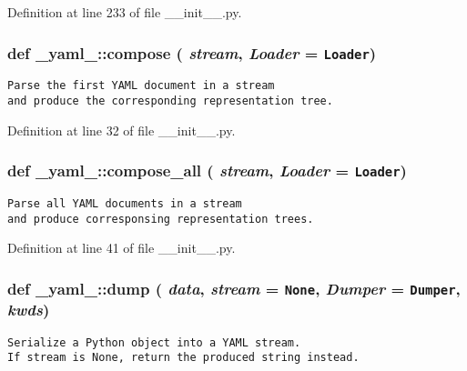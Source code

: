 Definition at line 233 of file \_\-\_\-init\_\-\_\-.py.
\subsubsection{\setlength{\rightskip}{0pt plus 5cm}def \_\-yaml\_\-::compose ( {\em stream},  {\em Loader} = {\tt Loader})}\label{namespace__yaml___aec1a82d2e13d6bd193ee22fed235aef}




\footnotesize\begin{verbatim}
Parse the first YAML document in a stream
and produce the corresponding representation tree.
\end{verbatim}
\normalsize
 

Definition at line 32 of file \_\-\_\-init\_\-\_\-.py.
\subsubsection{\setlength{\rightskip}{0pt plus 5cm}def \_\-yaml\_\-::compose\_\-all ( {\em stream},  {\em Loader} = {\tt Loader})}\label{namespace__yaml___b513f05a01e583b65804da7ca05403d9}




\footnotesize\begin{verbatim}
Parse all YAML documents in a stream
and produce corresponsing representation trees.
\end{verbatim}
\normalsize
 

Definition at line 41 of file \_\-\_\-init\_\-\_\-.py.
\subsubsection{\setlength{\rightskip}{0pt plus 5cm}def \_\-yaml\_\-::dump ( {\em data},  {\em stream} = {\tt None},  {\em Dumper} = {\tt Dumper},  {\em kwds})}\label{namespace__yaml___0a577516dcc37df2dfb6cb3acf06762d}




\footnotesize\begin{verbatim}
Serialize a Python object into a YAML stream.
If stream is None, return the produced string instead.
\end{verbatim}
\normalsize
 

